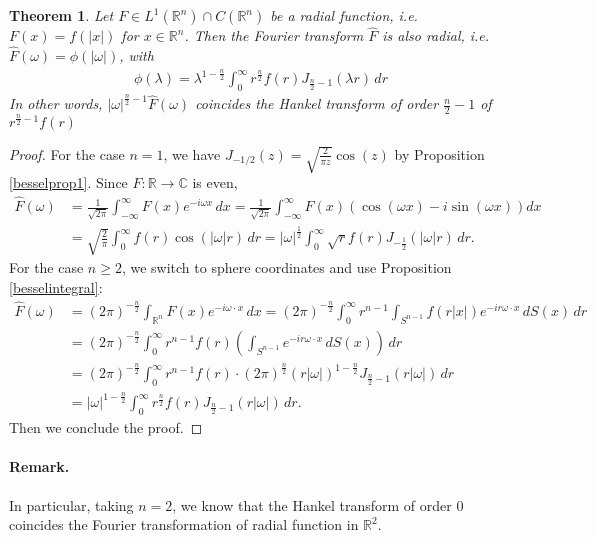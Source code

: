 \documentclass{article}
\numberwithin{equation}{section}
\newcommand{\bbC}{\mathbb{C}}
\newcommand{\bbR}{\mathbb{R}}
\newcommand{\wh}{\widehat}
\theoremstyle{plain}
\newtheorem{theorem}{Theorem}[section]
\theoremstyle{definition}
\begin{document}
\begin{theorem}
Let $F\in L^1(\bbR^n)\cap C(\bbR^n)$ be a radial function, i.e. $F(x)=f(\vert x\vert)$ for $x\in\bbR^n$. Then the Fourier transform $\wh{F}$ is also radial, i.e. $\wh{F}(\omega)=\phi(\vert\omega\vert)$, with
\begin{align*}
	\phi(\lambda)=\lambda^{1-\frac{n}{2}}\int_0^\infty r^{\frac{n}{2}}f(r)J_{\frac{n}{2}-1}(\lambda r)\,dr
\end{align*}
In other words, $\vert\omega\vert^{\frac{n}{2}-1}\wh{F}(\omega)$ coincides the Hankel transform of order $\frac{n}{2}-1$ of $r^{\frac{n}{2}-1}f(r)$
\end{theorem}
\begin{proof}
For the case $n=1$, we have $J_{-1/2}(z)=\sqrt{\frac{2}{\pi z}}\cos(z)$ by Proposition \ref{besselprop1}. Since $F:\bbR\to\bbC$ is even,
\begin{align*}
	\wh{F}(\omega)&=\frac{1}{\sqrt{2\pi}}\int_{-\infty}^\infty F(x)e^{-i\omega x}\,dx=\frac{1}{\sqrt{2\pi}}\int_{-\infty}^\infty F(x)\left(\cos(\omega x)-i\sin(\omega x)\right)dx\\
	&=\sqrt{\frac{2}{\pi}}\int_0^\infty f(r)\cos(\vert\omega\vert r)\,dr=\vert\omega\vert^{\frac{1}{2}}\int_0^\infty\sqrt{r}f(r) J_{-\frac{1}{2}}(\vert\omega\vert r)\,dr.
\end{align*}
For the case $n\geq 2$, we switch to sphere coordinates and use Proposition \ref{besselintegral}:
\begin{align*}
	\wh{F}(\omega)&=(2\pi)^{-\frac{n}{2}}\int_{\bbR^n}F(x)e^{-i\omega\cdot x}\,dx=(2\pi)^{-\frac{n}{2}}\int_0^\infty r^{n-1}\int_{S^{n-1}}f(r\vert x\vert)e^{-ir\omega\cdot x}\,dS(x)\,dr\\
	&=(2\pi)^{-\frac{n}{2}}\int_0^\infty r^{n-1}f(r)\left(\int_{S^{n-1}}e^{-ir\omega\cdot x}\,dS(x)\right)\,dr\\
	&=(2\pi)^{-\frac{n}{2}}\int_0^\infty r^{n-1}f(r)\cdot (2\pi)^{\frac{n}{2}}(r\vert\omega\vert)^{1-\frac{n}{2}}J_{\frac{n}{2}-1}(r\vert\omega\vert)\,dr\\
	&=\vert\omega\vert^{1-\frac{n}{2}}\int_0^\infty r^{\frac{n}{2}}f(r)J_{\frac{n}{2}-1}(r\vert\omega\vert)\,dr.
\end{align*}
Then we conclude the proof.
\end{proof}
\paragraph{Remark.} In particular, taking $n=2$, we know that the Hankel transform of order $0$ coincides the Fourier transformation of radial function in $\bbR^2$.
\end{document}
